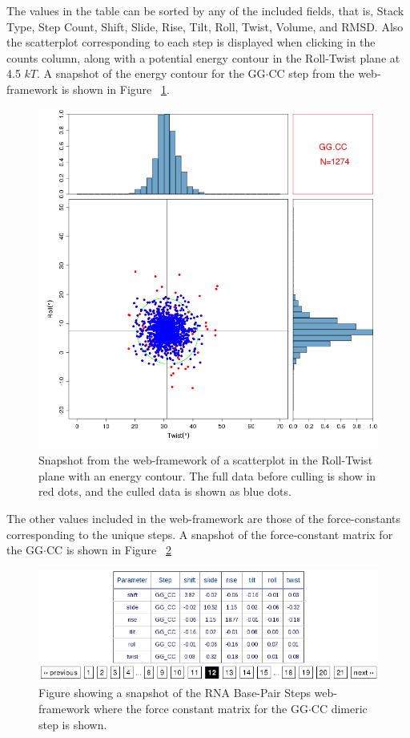 The values in the table can be sorted by any of the included fields,
that is, Stack Type, Step Count, Shift, Slide, Rise, Tilt, Roll,
Twist, Volume, and RMSD. Also the scatterplot corresponding to each
step is displayed when clicking in the counts column, along with a
potential energy contour in the Roll-Twist plane at 4.5 $kT$. A
snapshot of the energy contour for the GG$\cdot$CC step from the
web-framework is shown in Figure ~\ref{fig:contour}.
\begin{figure}[htbp]
\centering
\includegraphics[angle=0, scale=0.4]{Chapter4/contour.png}
\caption{Snapshot from the web-framework of a scatterplot in the
  Roll-Twist plane with an energy contour. The full data before
  culling is show in red dots, and the culled data is shown as blue dots.} 
\label{fig:contour}
\end{figure}

The other values included in the web-framework are those of the
force-constants corresponding to the unique steps. A snapshot of the
force-constant matrix for the GG$\cdot$CC is shown in Figure ~\ref{fig:forceconst}

\begin{figure}[htbp]
\centering
\includegraphics[angle=0, scale=0.6]{Chapter4/forceconst.png}
\caption{Figure showing a snapshot of the RNA Base-Pair Steps
  web-framework where the force constant matrix for the GG$\cdot$CC dimeric
  step is shown.}
\label{fig:forceconst}
\end{figure}  

